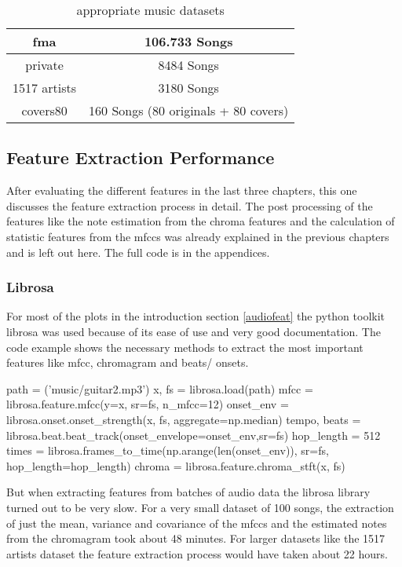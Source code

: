 \begin{table}[h]
	\label{used_dsets}
	\begin{center}
		\begin{tabular}{|c||c|}
			\hline
			fma & 106.733 Songs\\
			\hline
			private & 8484 Songs\\
			\hline
			1517 artists & 3180 Songs\\
			\hline
			covers80 & 160 Songs (80 originals + 80 covers)\\
			\hline
		\end{tabular}
	\end{center}
	\caption{appropriate music datasets}
\end{table}
\FloatBarrier

\subsection{Feature Extraction Performance}

After evaluating the different features in the last three chapters, this one discusses the feature extraction process in detail. The post processing of the features like the note estimation from the chroma features and the calculation of statistic features from the mfccs was already explained in the previous chapters and is left out here. The full code is in the appendices.

\subsubsection{Librosa}

For most of the plots in the introduction section \ref{audiofeat} the python toolkit librosa was used because of its ease of use and very good documentation. The code example shows the necessary methods to extract the most important features like mfcc, chromagram and beats/ onsets.
\lstset{language=Python} 
\begin{pythonCode}
path = ('music/guitar2.mp3')
x, fs = librosa.load(path)
mfcc = librosa.feature.mfcc(y=x, sr=fs, n_mfcc=12)
onset_env = librosa.onset.onset_strength(x, fs, aggregate=np.median)
tempo, beats = librosa.beat.beat_track(onset_envelope=onset_env,sr=fs)
hop_length = 512
times = librosa.frames_to_time(np.arange(len(onset_env)), sr=fs, hop_length=hop_length)
chroma = librosa.feature.chroma_stft(x, fs)
\end{pythonCode}	
But when extracting features from batches of audio data the librosa library turned out to be very slow. For a very small dataset of 100 songs, the extraction of just the mean, variance and covariance of the mfccs and the estimated notes from the chromagram took about 48 minutes. 
For larger datasets like the 1517 artists dataset the feature extraction process would have taken about 22 hours. 

